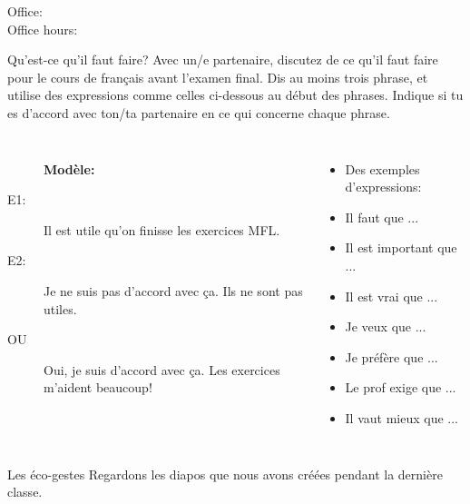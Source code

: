 \documentclass{beamer}
\subtitle[Révision, subjonctif]{Une révision du subjonctif}
\begin{document}
  \begin{frame}
    \titlepage
    \tiny{Office: \\
          Office hours: }
  \end{frame}

  \begin{frame}{Qu'est-ce qu'il faut faire?}
    \small
    Avec un/e partenaire, discutez de ce qu'il faut faire pour le cours de français avant l'examen final.
    Dis au moins trois phrase, et \alert{utilise des expressions comme celles ci-dessous} au début des phrases.
    Indique si tu es d'accord avec ton/ta partenaire en ce qui concerne chaque phrase.
    \begin{columns}[t]
        \begin{description}
          \item[] \textbf{Modèle:}
          \item[E1:] Il est utile qu'on finisse les exercices MFL.
          \item[E2:] Je ne suis pas d'accord avec ça. Ils ne sont pas utiles.
          \item[OU] Oui, je suis d'accord avec ça. Les exercices m'aident beaucoup!
        \end{description}
        \begin{itemize}
          \item[] Des exemples d'expressions:
          \item Il faut que ...
          \item Il est important que ...
          \item Il est vrai que ...
          \item Je veux que ...
          \item Je préfère que ...
          \item Le prof exige que ...
          \item Il vaut mieux que ...
        \end{itemize}
    \end{columns}
  \end{frame}

  \begin{frame}{Les éco-gestes}
    Regardons les diapos  que nous avons créées pendant la dernière classe.
  \end{frame}
\end{document}
